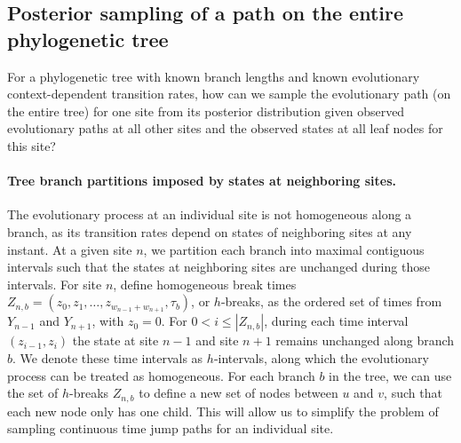 \documentclass[11pt]{article}
\begin{document}


\subsection{Posterior sampling of a path on the entire phylogenetic tree}

For a phylogenetic tree with known branch lengths and known
evolutionary context-dependent transition rates, how can we sample the
evolutionary path (on the entire tree) for one site from its posterior
distribution given observed evolutionary paths at all other sites and the
observed states at all leaf nodes for this site?

\paragraph{Tree branch partitions imposed by states at neighboring sites.}
The evolutionary process at an individual site is not homogeneous
along a branch, as its transition rates depend on states of
neighboring sites at any instant. At a given site $n$, we partition
each branch into maximal contiguous intervals such that the states at
neighboring sites are unchanged during those intervals. For site $n$,
define homogeneous break times $Z_{n,b} = (z_0,z_1,\ldots,z_{w_{n-1} +
  w_{n+1}}, \tau_b)$, or $h$-breaks, as the ordered set of times from
$Y_{n-1}$ and $Y_{n+1}$, with $z_0 = 0$. For $0 < i \leq |Z_{n,b}|$,
during each time interval $(z_{i-1}, z_{i})$ the state at site $n-1$
and site $n+1$ remains unchanged along branch $b$. We denote these
time intervals as $h$-intervals, along which the evolutionary process
can be treated as homogeneous.
For each branch $b$ in the tree, we can use the set of $h$-breaks
$Z_{n,b}$ to define a new set of nodes between $u$ and $v$, such that
each new node only has one child. This will allow us to simplify the
problem of sampling continuous time jump paths for an individual site.
\end{document}
